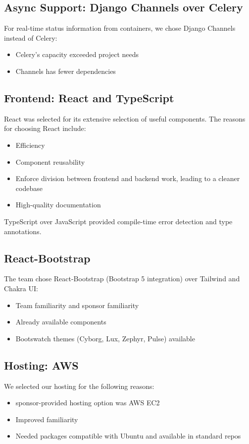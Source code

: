 \documentclass[12pt,titlepage]{article}
\begin{document}
\subsection{Async Support: Django Channels over Celery}

For real-time status information from containers, we chose Django Channels instead of Celery:
\begin{itemize}
    \item Celery's capacity exceeded project needs
    \item Channels has fewer dependencies
\end{itemize}

\subsection{Frontend: React and TypeScript}

React was selected for its extensive selection of useful components.
The reasons for choosing React include:
\begin{itemize}
    \item Efficiency
    \item Component reusability
    \item Enforce division between frontend and backend work, leading to a cleaner codebase
    \item High-quality documentation
\end{itemize}

TypeScript over JavaScript provided compile-time error detection and type annotations.

\subsection{React-Bootstrap}

The team chose React-Bootstrap (Bootstrap 5 integration) over Tailwind and Chakra UI:
\begin{itemize}
    \item Team familiarity and sponsor familiarity
    \item Already available components
    \item Bootswatch themes (Cyborg, Lux, Zephyr, Pulse) available
\end{itemize}

\subsection{Hosting: AWS}
We selected our hosting for the following reasons:
\begin{itemize}
    \item sponsor-provided hosting option was AWS EC2
    \item Improved familiarity
    \item Needed packages compatible with Ubuntu and available in standard repos
\end{itemize}
\end{document}
